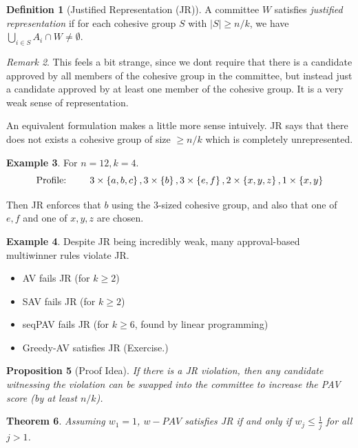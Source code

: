 \documentclass{book}
\theoremstyle{plain}
\newtheorem{theorem}{Theorem}[subsection]
\newtheorem{proposition}[theorem]{Proposition}
\theoremstyle{definition}
\newtheorem{definition}[theorem]{Definition}
\newtheorem{example}[theorem]{Example}
\theoremstyle{remark}
\newtheorem{remark}[theorem]{Remark}
\newcommand{\set}[1]{\left\{#1\right\}}
\begin{document}
\begin{definition}[Justified Representation (JR)]
    A committee $W$ satisfies \emph{justified representation}
    if for each 
    cohesive group $S$ with $|S| \geq n / k$,
    we have $\bigcup_{i \in S} A_i \cap W \neq \emptyset$.
\end{definition}
\begin{remark}
    This feels a bit strange, since we dont require 
    that there is a candidate approved by all 
    members of the cohesive group in the committee, but instead just 
    a candidate approved by at least one member of the cohesive group.
    It is a very weak sense of representation.

    An equivalent formulation makes a little more sense intuively.
    JR says that there does not exists a 
    cohesive group of size $\geq n/ k$ which is completely unrepresented.
\end{remark}


\begin{example}
    For $n = 12, k = 4$.
    \[
        \text{Profile: \qquad} 3 \times \set{a, b, c}, 3 \times \set{b}, 
        3 \times \set{e, f}, 2 \times \set{x, y, z},
        1 \times \set{x, y}
    \]

    Then JR enforces that $b$ using the $3$-sized cohesive group, 
    and also that one of $e, f$ and one of $x, y, z$ are chosen.
\end{example}

\begin{example}\label{e:fail-JR}
    Despite JR being incredibly weak,
    many approval-based multiwinner rules violate JR.
    \begin{itemize}
        \item AV fails JR (for $k \geq 2$)
        \item SAV fails JR (for $k \geq 2$)
        \item seqPAV fails JR (for $k \geq 6$, found by linear programming)
        \item Greedy-AV satisfies JR (Exercise.)
    \end{itemize}
\end{example}
\begin{proposition}[Proof Idea]
    If there is a JR violation, then any candidate witnessing the 
    violation can be swapped into the committee to increase the 
    PAV score (by at least $n/k$).
\end{proposition}

\begin{theorem}
    Assuming $w_1 = 1$, 
    $w-PAV$ satisfies JR 
    if and only if 
    $w_j \leq \frac{1}{j}$ for all 
    $j > 1$.
\end{theorem}
\end{document}
